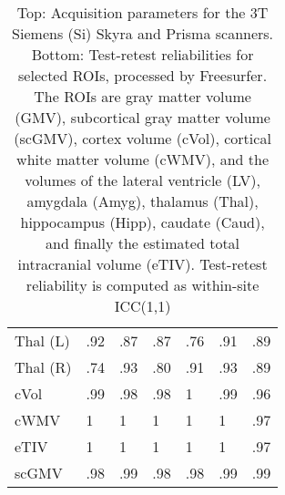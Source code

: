 \begin{table}
{\begin{tabular}{lllllll}
Thal (L)              &                 .92 &                 .87 &               .87 &                .76 &                .91 &                .89 \\
Thal (R)              &                 .74 &                 .93 &               .80 &                .91 &                .93 &                .89 \\
cVol                  &                 .99 &                 .98 &               .98 &                1   &                .99 &                .96 \\
cWMV                  &                 1   &                 1   &               1   &                1   &                1   &                .97 \\
eTIV                  &                 1   &                 1   &               1   &                1   &                1   &                .97 \\
scGMV                 &                 .98 &                 .99 &               .98 &                .98 &                .99 &                .99 \\
\bottomrule
\end{tabular}}
\fi
\caption{Top: Acquisition parameters for the 3T Siemens (Si) Skyra and Prisma scanners.  Bottom: Test-retest reliabilities for selected ROIs, processed by Freesurfer. The ROIs are gray matter volume (GMV), subcortical gray matter volume (scGMV), cortex volume (cVol), cortical white matter volume (cWMV), and the volumes of the lateral ventricle (LV), amygdala (Amyg), thalamus (Thal), hippocampus (Hipp), caudate (Caud), and finally the estimated total intracranial volume (eTIV). Test-retest reliability is computed as within-site ICC(1,1)} 
\label{tab:acquisition3}

\end{table}